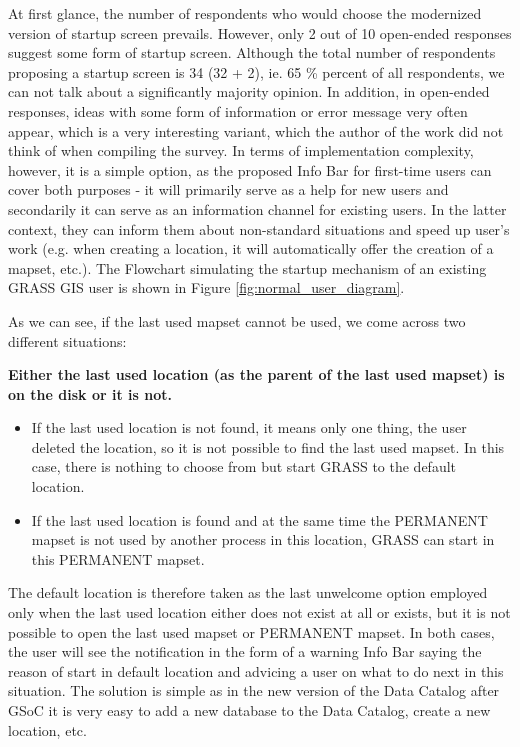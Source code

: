 \documentclass[a4paper,10pt,twoside]{article}
\begin{document}
At first glance, the number of respondents who would choose the modernized version of startup screen prevails. However, only 2 out of 10 open-ended responses suggest some form of startup screen. Although the total number of respondents proposing a startup screen is 34 (32 + 2), ie. 65 \% percent of all respondents, we can not talk about a significantly majority opinion. In addition, in open-ended responses, ideas with some form of information or error message very often appear, which is a very interesting variant, which the author of the work did not think of when compiling the survey. In terms of implementation complexity, however, it is a simple option, as the proposed Info Bar for first-time users can cover both purposes - it will primarily serve as a help for new users and secondarily it can serve as an information channel for existing users. In the latter context, they can inform them about non-standard situations and speed up user's work (e.g. when creating a location, it will automatically offer the creation of a mapset, etc.). The Flowchart simulating the startup mechanism of an existing GRASS GIS user is shown in Figure \ref{fig:normal_user_diagram}.

 As we can see, if the last used mapset cannot be used, we come across two different situations:

\noindent \textbf{Either the last used location (as the parent of the last used mapset) is on the disk or it is not.} 

\begin{itemize}
\item If the last used location is not found, it means only one thing, the user deleted the location, so it is not possible to find the last used mapset. In this case, there is nothing to choose from but start GRASS to the default location.
\item If the last used location is found and at the same time the PERMANENT mapset is not used by another process in this location, GRASS can start in this PERMANENT mapset.
\end{itemize}

The default location is therefore taken as the last unwelcome option employed only when the last used location either does not exist at all or exists, but it is not possible to open the last used mapset or PERMANENT mapset. In both cases, the user will see the notification in the form of a warning Info Bar saying the reason of start in default location and advicing a user on what to do next in this situation. The solution is simple as in the new version of the Data Catalog after GSoC it is very easy to add a new database to the Data Catalog, create a new location, etc. 
\end{document}
